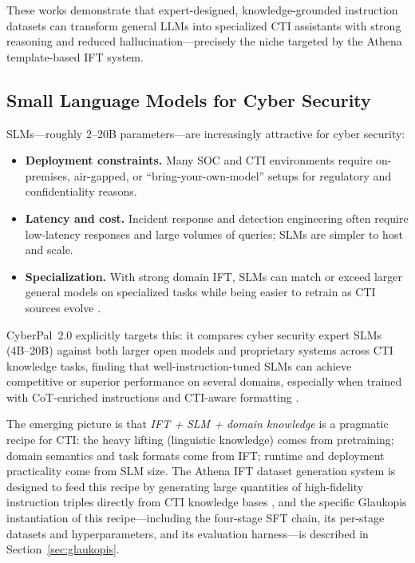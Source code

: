 \documentclass[unnumsec,webpdf,contemporary,large]{oup-authoring-template}
\theoremstyle{thmstyleone}
\theoremstyle{thmstyletwo}
\theoremstyle{thmstylethree}
\begin{document}
These works demonstrate that expert-designed, knowledge-grounded instruction datasets can transform general LLMs into specialized CTI assistants with strong reasoning and reduced hallucination---precisely the niche targeted by the Athena template-based IFT system.

\subsection{Small Language Models for Cyber Security}

SLMs---roughly 2--20B parameters---are increasingly attractive for cyber security:

\begin{itemize}
  \item \textbf{Deployment constraints.} Many SOC and CTI environments require on-premises, air-gapped, or ``bring-your-own-model'' setups for regulatory and confidentiality reasons.
  \item \textbf{Latency and cost.} Incident response and detection engineering often require low-latency responses and large volumes of queries; SLMs are simpler to host and scale.
  \item \textbf{Specialization.} With strong domain IFT, SLMs can match or exceed larger general models on specialized tasks while being easier to retrain as CTI sources evolve \cite{levi2025toward}.
\end{itemize}

CyberPal~2.0 explicitly targets this: it compares cyber security expert SLMs (4B--20B) against both larger open models and proprietary systems across CTI knowledge tasks, finding that well-instruction-tuned SLMs can achieve competitive or superior performance on several domains, especially when trained with CoT-enriched instructions and CTI-aware formatting \cite{levi2025toward}.

The emerging picture is that \emph{IFT + SLM + domain knowledge} is a pragmatic recipe for CTI: the heavy lifting (linguistic knowledge) comes from pretraining; domain semantics and task formats come from IFT; runtime and deployment practicality come from SLM size. The Athena IFT dataset generation system is designed to feed this recipe by generating large quantities of high-fidelity instruction triples directly from CTI knowledge bases \cite{cardei2025ift}, and the specific Glaukopis instantiation of this recipe---including the four-stage SFT chain, its per-stage datasets and hyperparameters, and its evaluation harness---is described in Section~\ref{sec:glaukopis}.
\end{document}
